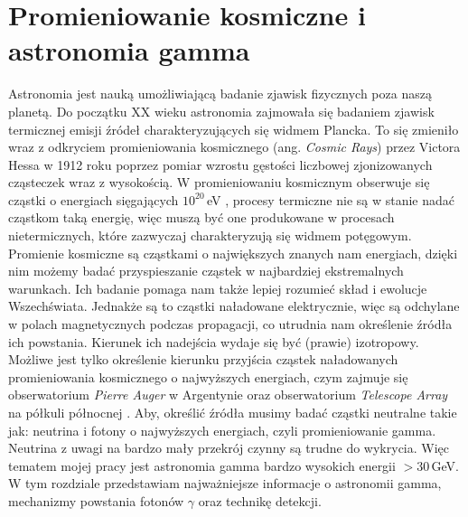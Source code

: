 \documentclass[a4paper,11pt,twoside]{article}
\begin{document}
\section{Promieniowanie kosmiczne i astronomia gamma}
Astronomia jest nauką umożliwiającą badanie zjawisk fizycznych poza naszą planetą. Do początku XX wieku astronomia zajmowała się badaniem zjawisk termicznej emisji źródeł charakteryzujących się widmem Plancka. To się zmieniło wraz z odkryciem promieniowania kosmicznego (ang. \textsl{Cosmic Rays}) przez Victora Hessa w 1912 roku poprzez pomiar wzrostu gęstości liczbowej zjonizowanych cząsteczek wraz z wysokością\cite{particle_de_angelis}. W promieniowaniu kosmicznym obserwuje się cząstki o energiach sięgających $10^{20}$\,eV \cite{particle_de_angelis}, procesy termiczne nie są w stanie nadać cząstkom taką energię, więc muszą być one produkowane w procesach nietermicznych, które zazwyczaj charakteryzują się widmem potęgowym. \\
Promienie kosmiczne są cząstkami o największych znanych nam energiach, 
dzięki nim możemy badać przyspieszanie cząstek w najbardziej ekstremalnych warunkach. Ich badanie pomaga nam także lepiej rozumieć skład i ewolucje Wszechświata. Jednakże są to cząstki naładowane elektrycznie, więc są odchylane w polach magnetycznych podczas propagacji, co utrudnia nam określenie źródła ich powstania. Kierunek ich nadejścia wydaje się być (prawie) izotropowy. Możliwe jest tylko określenie kierunku przyjścia cząstek naładowanych promieniowania kosmicznego o najwyższych energiach, czym zajmuje się obserwatorium \textsl{Pierre Auger} w Argentynie \cite{auger_web} \cite{auger_result} oraz obserwatorium \textsl{Telescope Array} na półkuli północnej \cite{telescope_array_web}. Aby, określić źródła musimy badać cząstki neutralne takie jak: neutrina i fotony o najwyższych energiach, czyli promieniowanie gamma. Neutrina z uwagi na bardzo mały przekrój czynny są trudne do wykrycia. Więc tematem mojej pracy jest astronomia gamma bardzo wysokich energii $>30$\,GeV. W tym rozdziale przedstawiam najważniejsze informacje o astronomii gamma, mechanizmy powstania fotonów $\gamma$ oraz technikę detekcji.
\end{document}
